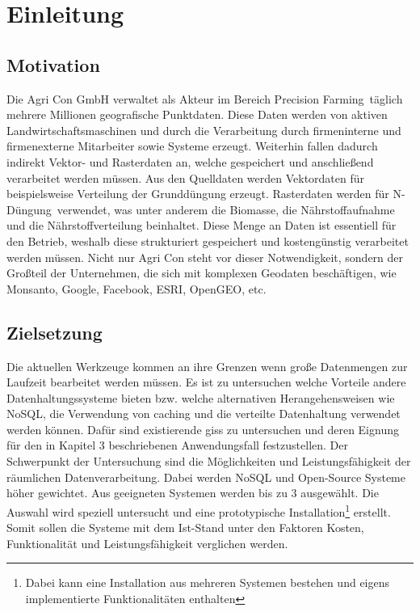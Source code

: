 \chapter{Einleitung}


\section{Motivation}

Die Agri Con GmbH verwaltet als Akteur im Bereich \glqq Precision Farming\grqq\ täglich mehrere Millionen geografische Punktdaten. Diese Daten werden von aktiven Landwirtschaftsmaschinen und durch die Verarbeitung durch firmeninterne und firmenexterne Mitarbeiter sowie Systeme erzeugt. Weiterhin fallen dadurch indirekt Vektor- und Rasterdaten an, welche gespeichert und anschließend verarbeitet werden müssen.
Aus den Quelldaten werden Vektordaten für beispielsweise Verteilung der Grunddüngung erzeugt. Rasterdaten werden für \glqq N-Düngung\grqq\  verwendet, was unter anderem die Biomasse, die Nährstoffaufnahme und die Nährstoffverteilung beinhaltet.
Diese Menge an Daten ist essentiell für den Betrieb, weshalb diese strukturiert gespeichert und kostengünstig verarbeitet werden müssen. Nicht nur Agri Con steht vor dieser Notwendigkeit, sondern der Großteil der Unternehmen, die sich mit komplexen Geodaten beschäftigen, wie Monsanto, Google, Facebook, ESRI, OpenGEO, etc.




\section{Zielsetzung}

Die aktuellen Werkzeuge kommen an ihre Grenzen wenn große Datenmengen zur Laufzeit bearbeitet werden müssen. Es ist zu untersuchen welche Vorteile andere Datenhaltungssysteme bieten bzw. welche alternativen Herangehensweisen wie NoSQL, die Verwendung von caching und die verteilte Datenhaltung verwendet werden können.
Dafür sind existierende \Glspl{gis} zu untersuchen und deren Eignung für den in Kapitel 3 beschriebenen Anwendungsfall festzustellen. Der Schwerpunkt der Untersuchung sind die Möglichkeiten und Leistungsfähigkeit der räumlichen Datenverarbeitung.
Dabei werden NoSQL und Open-Source Systeme höher gewichtet.
Aus geeigneten Systemen werden bis zu 3 ausgewählt. Die Auswahl wird speziell untersucht und eine prototypische Installation\footnote{Dabei kann eine Installation aus mehreren Systemen bestehen und eigens implementierte Funktionalitäten enthalten} erstellt.
Somit sollen die Systeme mit dem Ist-Stand unter den Faktoren Kosten, Funktionalität und Leistungsfähigkeit verglichen werden.


